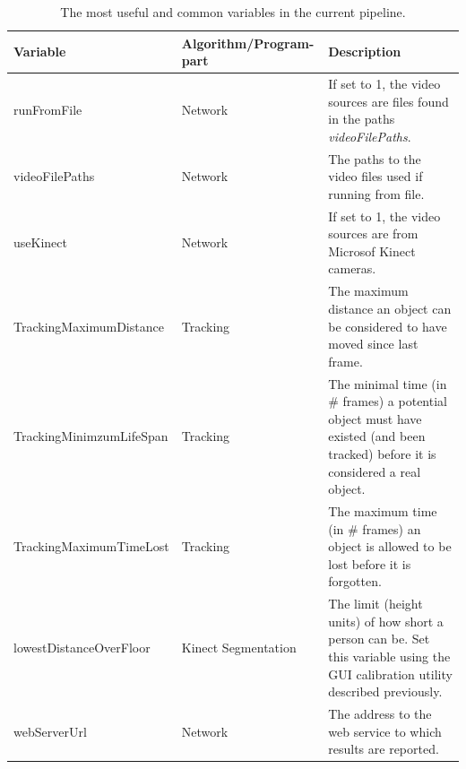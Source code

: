 \begin{table}[hbt]
	\begin{tabular}{ | l | l | p{7.5cm} | }
	    \hline
	    \textbf{Variable} & \textbf{Algorithm/Program-part} & \textbf{Description} \\ \hline
	    runFromFile & Network & If set to 1, the video sources are files found in the paths \textit{videoFilePaths}.  \\ \hline
	    videoFilePaths & Network & The paths to the video files used if running from file.  \\ \hline
	    useKinect & Network & If set to 1, the video sources are from Microsof Kinect cameras. \\ \hline
	    TrackingMaximumDistance & Tracking & The maximum distance an object can be considered to have moved since last frame. \\ \hline
	    TrackingMinimzumLifeSpan & Tracking & The minimal time (in \# frames) a potential object must have existed (and been tracked) before it is considered a real object. \\ \hline
	    TrackingMaximumTimeLost & Tracking & The maximum time (in \# frames) an object is allowed to be lost before it is forgotten. \\ \hline
	    lowestDistanceOverFloor & Kinect Segmentation & The limit (height units) of how short a person can be. Set this variable using the GUI calibration utility described previously. \\ \hline
	    webServerUrl & Network & The address to the web service to which results are reported. \\ \hline
	\end{tabular}
	\label{table:commonVariables}
	\caption{The most useful and common variables in the current pipeline.}
\end{table}


